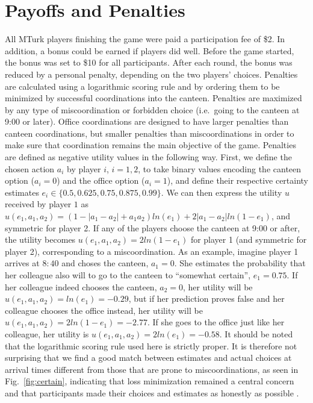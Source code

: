 \section{Payoffs and Penalties} \label{appendix:payoffs}
 All MTurk players finishing the game were paid a participation fee of \$2. In addition, a bonus could be earned if players did well. Before the game started, the bonus was set to \$10 for all participants. After each round, the bonus was reduced by a personal penalty, depending on the two players' choices. Penalties are calculated using a logarithmic scoring rule and by ordering them to be minimized by successful coordinations into the canteen. Penalties are maximized by any type of miscoordination or forbidden choice (i.e.\ going to the canteen at 9:00 or later). Office coordinations are designed to have larger penalties than canteen coordinations, but smaller penalties than miscoordinations in order to make sure that coordination remains the main objective of the game. Penalties are defined as negative utility values in the following way. First, we define the chosen action $a_i$ by player $i$, $i=1,2$, to take binary values encoding the canteen option ($a_i=0$) and the office option ($a_i=1$), and define their respective certainty estimates $e_i \in \{0.5, 0.625, 0.75, 0.875, 0.99\}$. We can then express the utility $u$ received by player $1$ as $u(e_1, a_1, a_2) = (1-|a_1-a_2| + a_1a_2)ln(e_1) + 2|a_1-a_2|ln(1-e_1)$, and symmetric for player 2. If any of the players choose the canteen at 9:00 or after, the utility becomes $u(e_1,a_1,a_2) = 2ln(1-e_1)$ for player 1 (and symmetric for player 2), corresponding to a miscoordination. As an example, imagine player 1 arrives at $8{:}40$ and choses the canteen, $a_1=0$. She estimates the probability that her colleague also will to go to the canteen to ``somewhat certain'', $e_1=0.75$. If her colleague indeed chooses the canteen, $a_2=0$, her utility will be $u(e_1,a_1,a_2) = ln(e_1) = -0.29$, but if her prediction proves false and her colleague chooses the office instead, her utility will be $u(e_1,a_1,a_2) = 2ln(1-e_1)=-2.77$. If she goes to the office just like her colleague, her utility is $u(e_1,a_1,a_2) = 2ln(e_1)=-0.58$. It should be noted that the logarithmic scoring rule used here is strictly proper. It is therefore not surprising that we find a good match between estimates and actual choices at arrival times different from those that are prone to miscoordinations, as seen in Fig.~\ref{fig:certain}, indicating that loss minimization remained a central concern and that participants made their choices and estimates as honestly as possible \cite{good1992rational, seidenfeld1985calibration, palfrey2009eliciting}.

